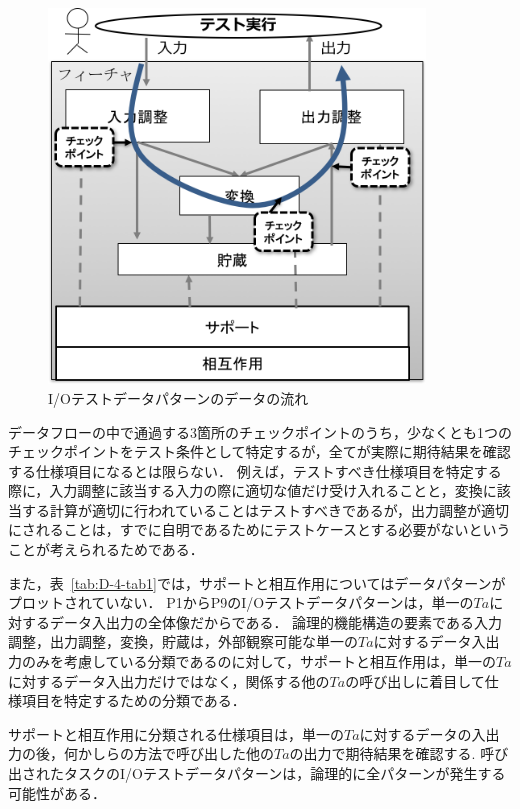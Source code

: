  \begin{figure}[htbp]
 \begin{center}
 \includegraphics[width=10cm]{./image/D-4-Fig7.png}
 \caption{I/Oテストデータパターンのデータの流れ}
 \label{fig:D-4-Fig7}
 \end{center}
 \end{figure}

データフローの中で通過する3箇所のチェックポイントのうち，少なくとも1つのチェックポイントをテスト条件として特定するが，全てが実際に期待結果を確認する仕様項目になるとは限らない．
例えば，テストすべき仕様項目を特定する際に，入力調整に該当する入力の際に適切な値だけ受け入れることと，変換に該当する計算が適切に行われていることはテストすべきであるが，出力調整が適切にされることは，すでに自明であるためにテストケースとする必要がないということが考えられるためである．

また，表~\ref{tab:D-4-tab1}では，サポートと相互作用についてはデータパターンがプロットされていない．
P1からP9のI/Oテストデータパターンは，単一の$Ta$に対するデータ入出力の全体像だからである．
論理的機能構造の要素である入力調整，出力調整，変換，貯蔵は，外部観察可能な単一の$Ta$に対するデータ入出力のみを考慮している分類であるのに対して，サポートと相互作用は，単一の$Ta$に対するデータ入出力だけではなく，関係する他の$Ta$の呼び出しに着目して仕様項目を特定するための分類である．

サポートと相互作用に分類される仕様項目は，単一の$Ta$に対するデータの入出力の後，何かしらの方法で呼び出した他の$Ta$の出力で期待結果を確認する.
呼び出されたタスクのI/Oテストデータパターンは，論理的に全パターンが発生する可能性がある．


